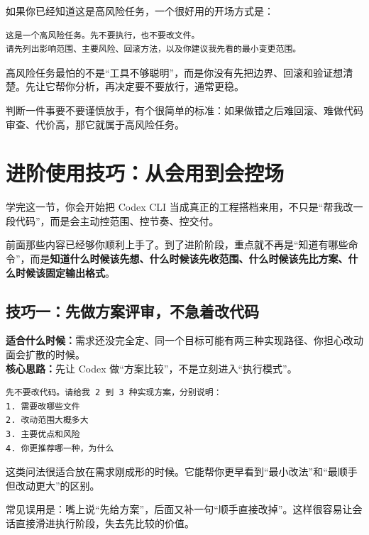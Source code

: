 \documentclass[UTF8,a4paper,12pt]{ctexart}
\begin{document}
如果你已经知道这是高风险任务，一个很好用的开场方式是：

\begin{lstlisting}[style=prompt]
这是一个高风险任务。先不要执行，也不要改文件。
请先列出影响范围、主要风险、回滚方法，以及你建议我先看的最小变更范围。
\end{lstlisting}

\begin{tipbox}
高风险任务最怕的不是“工具不够聪明”，而是你没有先把边界、回滚和验证想清楚。先让它帮你分析，再决定要不要放行，通常更稳。
\end{tipbox}

\begin{sumbox}
判断一件事要不要谨慎放手，有个很简单的标准：如果做错之后难回滚、难做代码审查、代价高，那它就属于高风险任务。
\end{sumbox}

\section{进阶使用技巧：从会用到会控场}

\begin{learnbox}
学完这一节，你会开始把 Codex CLI 当成真正的工程搭档来用，不只是“帮我改一段代码”，而是会主动控范围、控节奏、控交付。
\end{learnbox}

前面那些内容已经够你顺利上手了。到了进阶阶段，重点就不再是“知道有哪些命令”，而是\textbf{知道什么时候该先想、什么时候该先收范围、什么时候该先比方案、什么时候该固定输出格式}。

\subsection{技巧一：先做方案评审，不急着改代码}

\textbf{适合什么时候：}需求还没完全定、同一个目标可能有两三种实现路径、你担心改动面会扩散的时候。\\
\textbf{核心思路：}先让 Codex 做“方案比较”，不是立刻进入“执行模式”。

\begin{lstlisting}[style=prompt]
先不要改代码。请给我 2 到 3 种实现方案，分别说明：
1. 需要改哪些文件
2. 改动范围大概多大
3. 主要优点和风险
4. 你更推荐哪一种，为什么
\end{lstlisting}

这类问法很适合放在需求刚成形的时候。它能帮你更早看到“最小改法”和“最顺手但改动更大”的区别。

\begin{warnbox}
常见误用是：嘴上说“先给方案”，后面又补一句“顺手直接改掉”。这样很容易让会话直接滑进执行阶段，失去先比较的价值。
\end{warnbox}
\end{document}
